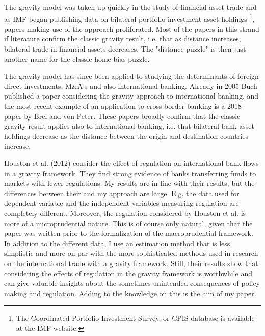 \documentclass[12pt,a4paper]{article}
\begin{document}
The gravity model was taken up quickly in the study of financial asset trade and as IMF began publishing data on bilateral portfolio investment asset holdings \footnote{The Coordinated Portfolio Investment Survey, or CPIS-database is available at the IMF website.}, papers making use of the approach proliferated. Most of the papers in this strand if literature confirm the classic gravity result, i.e. that as distance increases, bilateral trade in financial assets decreases. The "distance puzzle" is then just another name for the classic home bias puzzle.

The gravity model has since been applied to studying the determinants of foreign direct investments, M\&A's and also international banking. Already in 2005 Buch published a paper considering the gravity approach to international banking, and the most recent example of an application to cross-border banking is a 2018 paper by Brei and von Peter. These papers broadly confirm that the classic gravity result applies also to international banking, i.e. that bilateral bank asset holdings decrease as the distance between the origin and destination countries increase. 

Houston et al. (2012) consider the effect of regulation on international bank flows in a gravity framework. They find strong evidence of banks transferring funds to markets with fewer regulations. My results are in line with their results, but the differences between their and my approach are large. E.g. the data used for dependent variable and the independent variables measuring regulation are completely different. Moreover, the regulation considered by Houston et al. is more of a microprudential nature. This is of course only natural, given that the paper was written prior to the formalization of the macroprudential framework. In addition to the different data, I use an estimation method that is less simplistic and more on par with the more sophisticated methods used in research on the international trade with a gravity framework. Still, their results show that considering the effects of regulation in the gravity framework is worthwhile and can give valuable insights about the sometimes unintended consequences of policy making and regulation. Adding to the knowledge on this is the aim of my paper.
\end{document}

